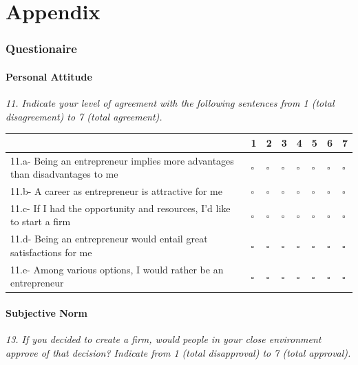 \part*{Appendix}
\renewcommand{\thesection}{\arabic{section}}
\renewcommand{\theequation}{\arabic{equation}}
\section{Questionaire}\label{section:Appendix One}
\subsection{Personal Attitude}
\emph{11. Indicate your level of agreement with the following sentences from 1 (total disagreement) to 7 (total agreement).}

\begin{table}[H]
\scriptsize	
\centering

\begin{tabular}{p{10cm}lllllll}
\toprule
                                                                             & 1         & 2         & 3         & 4         & 5         & 6         & 7         \\ \midrule
11.a- Being an entrepreneur implies more advantages than disadvantages to me & $\square$ & $\square$ & $\square$ & $\square$ & $\square$ & $\square$ & $\square$ \\
11.b- A career as entrepreneur is attractive for me                          & $\square$ & $\square$ & $\square$ & $\square$ & $\square$ & $\square$ & $\square$ \\
11.c- If I had the opportunity and resources, I'd like to start a firm       & $\square$ & $\square$ & $\square$ & $\square$ & $\square$ & $\square$ & $\square$ \\
11.d- Being an entrepreneur would entail great satisfactions for me          & $\square$ & $\square$ & $\square$ & $\square$ & $\square$ & $\square$ & $\square$ \\
11.e- Among various options, I would rather be an entrepreneur               & $\square$ & $\square$ & $\square$ & $\square$ & $\square$ & $\square$ & $\square$ \\ \bottomrule
\end{tabular}
\end{table}

\subsection{Subjective Norm}
\emph{13. If you decided to create a firm, would people in your close environment approve of that decision? Indicate from 1 (total disapproval) to 7 (total approval).}

